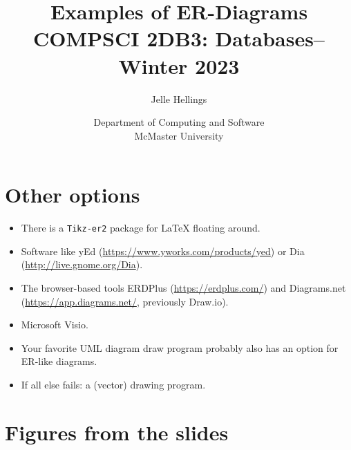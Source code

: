 \documentclass{article}
\newcommand{\key}[1]{\underline{\smash{#1}}}
\begin{document}
\title{Examples of ER-Diagrams\\{\Large COMPSCI 2DB3: Databases--Winter 2023}}
\author{Jelle Hellings}
\date{{\normalsize
    Department of Computing and Software\\
    McMaster University
}}


\maketitle

\section{Other options}
\begin{itemize}
    \item There is a \verb!Tikz-er2! package for \LaTeX{} floating around.
    \item Software like yEd (\url{https://www.yworks.com/products/yed}) or Dia (\url{http://live.gnome.org/Dia}).
    \item The browser-based tools ERDPlus (\url{https://erdplus.com/}) and Diagrams.net (\url{https://app.diagrams.net/}, previously Draw.io).
    \item Microsoft Visio.
    \item Your favorite UML diagram draw program probably also has an option for ER-like diagrams.
    \item If all else fails: a (vector) drawing program.
\end{itemize}

\section{Figures from the slides}

\\\bigskip
\end{document}
